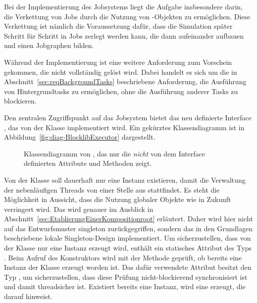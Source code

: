 Bei der Implementierung des Jobsystems liegt die Aufgabe insbesondere darin, die Verkettung von Jobs durch die Nutzung von \classCompletableFuture{}-Objekten zu ermöglichen. Diese Verkettung ist nämlich die Voraussetzung dafür, dass die Simulation später Schritt für Schritt in Jobs zerlegt werden kann, die dann aufeinander aufbauen und einen Jobgraphen bilden. 

Während der Implementierung ist eine weitere Anforderung zum Vorschein gekommen, die nicht vollständig gelöst wird. Dabei handelt es sich um die in Abschnitt~\vref{sec:reqBackgroundTasks} beschriebene Anforderung, die Ausführung von Hintergrundtasks zu ermöglichen, ohne die Ausführung anderer Tasks zu blockieren. 

Den zentralen Zugriffspunkt auf das Jobsystem bietet das neu definierte Interface \classBlocklibExecutorService{}, das von der Klasse \classBlocklibExecutor{} implementiert wird. Ein gekürztes Klassendiagramm ist in Abbildung~\vref{fig:diag-BlocklibExecutor} dargestellt.

\begin{figure}[!htb]
	\centering
	
	\caption[Gekürztes Klassendiagramm von \classBlocklibExecutor{}.]{Klassendiagramm von \classBlocklibExecutor{}, das nur die \emph{nicht} von dem Interface \classBlocklibExecutorService{} definierten Attribute und Methoden zeigt.}\label{fig:diag-BlocklibExecutor}
\end{figure}

Von der Klasse \classBlocklibExecutor{} soll dauerhaft nur eine Instanz existieren, damit die Verwaltung der nebenläufigen Threads von einer Stelle aus stattfindet. Es steht die Möglichkeit in Aussicht, dass die Nutzung globaler Objekte wie \classContext{} in Zukunft verringert wird. Das wird genauer im Ausblick in Abschnitt~\vref{sec:EtablierungEinerKompositionroot} erläutert. Daher wird hier nicht auf das Entwurfsmuster \gls{singleton} zurückgegriffen, sondern das in den Grundlagen beschriebene lokale Singleton-Design implementiert. Um sicherzustellen, dass von der Klasse nur eine Instanz erzeugt wird, enthält \classBlocklibExecutor{} ein statisches Attribut  des Typs \classAtomicBoolean{}. Beim Aufruf des Konstruktors wird mit der Methode  geprüft, ob bereits eine Instanz der Klasse erzeugt worden ist. Das dafür verwendete Attribut  besitzt den Typ , um sicherzustellen, dass diese Prüfung nicht-blockierend synchronisiert ist und damit threadsicher ist. Existiert bereits eine Instanz, wird eine \classUnsupportedOperationException{} erzeugt, die darauf hinweist.

